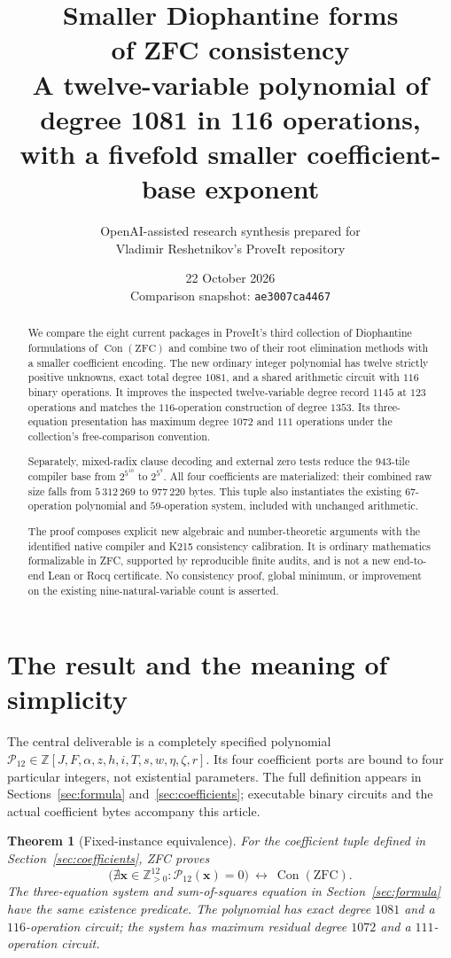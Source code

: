 \documentclass[11pt,a4paper]{article}
\title{\textbf{Smaller Diophantine forms\\of ZFC consistency}\\[7pt]
\large A twelve-variable polynomial of degree 1081 in 116 operations,\\
with a fivefold smaller coefficient-base exponent}
\author{OpenAI-assisted research synthesis prepared for\\Vladimir Reshetnikov's ProveIt repository}
\date{22 October 2026\\[3pt]\small Comparison snapshot: \texttt{ae3007ca4467}}
\newtheorem{theorem}{Theorem}[section]
\theoremstyle{remark}\newtheorem{remark}[theorem]{Remark}
\newcommand{\ZZ}{\mathbb Z}
\newcommand{\PP}{\mathbb Z_{>0}}
\newcommand{\Con}{\operatorname{Con}}
\newcommand{\ZFC}{\mathrm{ZFC}}
\begin{document}
\maketitle
\begin{abstract}
We compare the eight current packages in ProveIt's third collection of
Diophantine formulations of $\Con(\ZFC)$ and combine two of their root
elimination methods with a smaller coefficient encoding. The new ordinary
integer polynomial has twelve strictly positive unknowns, exact total degree
$1081$, and a shared arithmetic circuit with $116$ binary operations.
It improves the inspected twelve-variable degree record $1145$ at $123$
operations and matches the $116$-operation construction of degree $1353$.
Its three-equation presentation has maximum degree $1072$ and $111$
operations under the collection's free-comparison convention.

Separately, mixed-radix clause decoding and external zero tests reduce the
943-tile compiler base from $2^{5^{10}}$ to $2^{5^9}$. All four coefficients
are materialized: their combined raw size falls from $5\,312\,269$ to
$977\,220$ bytes. This tuple also instantiates the existing $67$-operation
polynomial and $59$-operation system, included with unchanged arithmetic.

The proof composes explicit new algebraic and number-theoretic arguments
with the identified native compiler and K215 consistency calibration.
It is ordinary mathematics formalizable in ZFC, supported by reproducible
finite audits, and is not a new end-to-end Lean or Rocq certificate.
No consistency proof, global minimum, or improvement on the existing
nine-natural-variable count is asserted.
\end{abstract}
\clearpage
\begingroup\small\tableofcontents\endgroup
\clearpage

\section{The result and the meaning of simplicity}
\label{sec:result}

The central deliverable is a completely specified polynomial
$\mathcal P_{12}\in\ZZ[J,F,\alpha,z,h,i,T,s,w,\eta,\zeta,r]$.
Its four coefficient ports are bound to four particular integers, not
existential parameters. The full definition appears in
Sections~\ref{sec:formula} and~\ref{sec:coefficients}; executable binary
circuits and the actual coefficient bytes accompany this article.

\begin{theorem}[Fixed-instance equivalence]
\label{thm:main}
For the coefficient tuple defined in Section~\ref{sec:coefficients}, ZFC
proves
\[
 \boxed{\quad
 \bigl(\nexists\mathbf x\in\PP^{12}:\mathcal P_{12}(\mathbf x)=0\bigr)
 \ \longleftrightarrow\ \Con(\ZFC).
 \quad}
\]
The three-equation system and sum-of-squares equation in
Section~\ref{sec:formula} have the same existence predicate.
The polynomial has exact degree $1081$ and a $116$-operation circuit;
the system has maximum residual degree $1072$ and a $111$-operation circuit.
\end{theorem}
\end{document}
